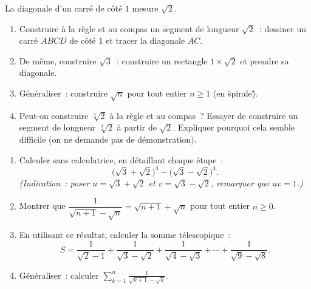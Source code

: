 \begin{challenge}
La diagonale d'un carr\'e de c\^ot\'e $1$ mesure $\sqrt{2}$.
\begin{enumerate}
  \item Construire \`a la r\`egle et au compas un segment de longueur
        $\sqrt{2}$~: dessiner un carr\'e $ABCD$ de c\^ot\'e $1$ et tracer
        la diagonale $AC$.
  \item De m\^eme, construire $\sqrt{3}$~: construire un rectangle $1\times\sqrt{2}$
        et prendre sa diagonale.
  \item G\'en\'eraliser~: construire $\sqrt{n}$ pour tout entier $n \geq 1$
        (en \"spirale\").
  \item Peut-on construire $\sqrt[3]{2}$ \`a la r\`egle et au compas~?
        Essayer de construire un segment de longueur $\sqrt[3]{2}$
        \`a partir de $\sqrt{2}$. Expliquer pourquoi cela semble difficile
        (on ne demande pas de d\'emonstration).
\end{enumerate}
\end{challenge}

\begin{challenge}
\begin{enumerate}
  \item Calculer sans calculatrice, en d\'etaillant chaque \'etape~:
        $$\bigl(\sqrt{3}+\sqrt{2}\bigr)^4 - \bigl(\sqrt{3}-\sqrt{2}\bigr)^4.$$
        \emph{(Indication~: poser $u=\sqrt{3}+\sqrt{2}$ et $v=\sqrt{3}-\sqrt{2}$,
        remarquer que $uv=1$.)}
  \item Montrer que $\dfrac{1}{\sqrt{n+1}-\sqrt{n}} = \sqrt{n+1}+\sqrt{n}$
        pour tout entier $n \geq 0$.
  \item En utilisant ce r\'esultat, calculer la somme t\'elescopique~:
        $$S = \frac{1}{\sqrt{2}-1} + \frac{1}{\sqrt{3}-\sqrt{2}}
             + \frac{1}{\sqrt{4}-\sqrt{3}} + \cdots + \frac{1}{\sqrt{9}-\sqrt{8}}.$$
  \item G\'en\'eraliser~: calculer
        $\displaystyle\sum_{k=1}^{n} \frac{1}{\sqrt{k+1}-\sqrt{k}}$.
\end{enumerate}
\end{challenge}

